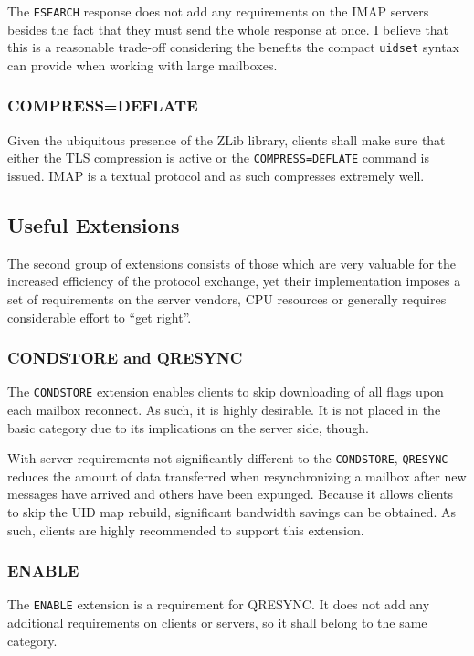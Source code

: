\documentclass[trojita]{subfiles}
\begin{document}
The {\tt ESEARCH} response does not add any requirements on the IMAP servers besides the fact that they must send the
whole response at once.  I believe that this is a reasonable trade-off considering the benefits the compact {\tt uidset}
syntax can provide when working with large mailboxes.

\subsubsection{COMPRESS=DEFLATE}

Given the ubiquitous presence of the ZLib library, clients shall make sure that either the TLS compression is active or
the {\tt COMPRESS=DEFLATE} command is issued.  IMAP is a textual protocol and as such compresses extremely well.

\subsection{Useful Extensions}

The second group of extensions consists of those which are very valuable for the increased efficiency of the protocol
exchange, yet their implementation imposes a set of requirements on the server vendors, CPU resources or generally
requires considerable effort to ``get right''.

\subsubsection{CONDSTORE and QRESYNC}

The {\tt CONDSTORE} extension enables clients to skip downloading of all flags upon each mailbox reconnect.  As such, it
is highly desirable.  It is not placed in the basic category due to its implications on the server side, though.

With server requirements not significantly different to the {\tt CONDSTORE}, {\tt QRESYNC} reduces the amount of data
transferred when resynchronizing a mailbox after new messages have arrived and others have been expunged.  Because it
allows clients to skip the UID map rebuild, significant bandwidth savings can be obtained.  As such, clients are highly
recommended to support this extension.

\subsubsection{ENABLE}

The {\tt ENABLE} extension is a requirement for QRESYNC.  It does not add any additional requirements on clients or
servers, so it shall belong to the same category.
\end{document}
